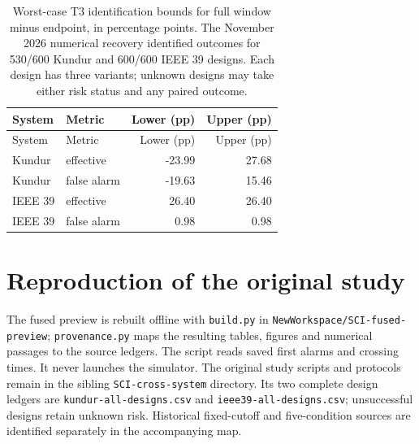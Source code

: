 \documentclass[10pt]{article}
\begin{document}
\begingroup\small\setlength{\tabcolsep}{3.8pt}
\begin{longtable}{llrr}
\caption{Worst-case T3 identification bounds for full window minus endpoint, in percentage points. The November 2026 numerical recovery identified outcomes for 530/600 Kundur and 600/600 IEEE 39 designs. Each design has three variants; unknown designs may take either risk status and any paired outcome.}\label{tab:recovered-worst}\\
\toprule System & Metric & Lower (pp) & Upper (pp) \\\midrule\endfirsthead
\toprule System & Metric & Lower (pp) & Upper (pp) \\\midrule\endhead
Kundur & effective & -23.99 & 27.68 \\
Kundur & false alarm & -19.63 & 15.46 \\
IEEE 39 & effective & 26.40 & 26.40 \\
IEEE 39 & false alarm & 0.98 & 0.98 \\
\bottomrule\end{longtable}\endgroup
\section{Reproduction of the original study}
The fused preview is rebuilt offline with \texttt{build.py} in \texttt{NewWorkspace/SCI-fused-preview}; \texttt{provenance.py} maps the resulting tables, figures and numerical passages to the source ledgers. The script reads saved first alarms and crossing times. It never launches the simulator. The original study scripts and protocols remain in the sibling \texttt{SCI-cross-system} directory. Its two complete design ledgers are \texttt{kundur-all-designs.csv} and \texttt{ieee39-all-designs.csv}; unsuccessful designs retain unknown risk. Historical fixed-cutoff and five-condition sources are identified separately in the accompanying map.
\end{document}

